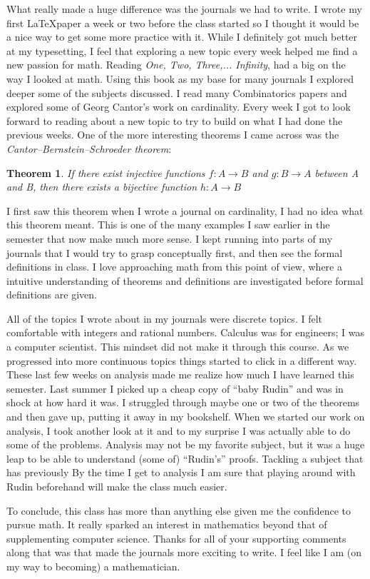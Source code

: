 \documentclass{article}
\newtheorem*{thm}{Theorem}
\begin{document}
What really made a huge difference was the journals we had to write.
I wrote my first \LaTeX  paper a week or two before the class started so I thought it would be a nice way to get some more practice with it.
While I definitely got much better at my typesetting, I feel that exploring a new topic every week helped me find a new passion for math.
Reading \textit{One, Two, Three,... Infinity}, had a big on the way I looked at math.
Using this book as my base for many journals I explored deeper some of the subjects discussed.
I read many Combinatorics papers and explored some of Georg Cantor's work on cardinality.
Every week I got to look forward to reading about a new topic to try to build on what I had done the previous weeks.
One of the more interesting theorems I came across was the \textit{Cantor–Bernstein–Schroeder theorem}:
\begin{thm}
If there exist injective functions $f : A \to B$ and $g : B \to A$ between A and B, then there exists a bijective function $h : A \to B$
\end{thm}
I first saw this theorem when I wrote a journal on cardinality, I had no idea what this theorem meant.
This is one of the many examples I saw earlier in the semester that now make much more sense.
I kept running into parts of my journals that I would try to grasp conceptually first, and then see the formal definitions in class.
I love approaching math from this point of view, where a intuitive understanding of theorems and definitions are investigated before formal definitions are given.

All of the topics I wrote about in my journals were discrete topics.
I felt comfortable with integers and rational numbers.
Calculus was for engineers; I was a computer scientist.
This mindset did not make it through this course.
As we progressed into more continuous topics things started to click in a different way.
These last few weeks on analysis made me realize how much I have learned this semester.
Last summer I picked up a cheap copy of ``baby Rudin'' and was in shock at how hard it was.
I struggled through maybe one or two of the theorems and then gave up, putting it away in my bookshelf.
When we started our work on analysis, I took another look at it and to my surprise I was actually able to do some of the problems.
Analysis may not be my favorite subject, but it was a huge leap to be able to understand (some of) ``Rudin's'' proofs.
Tackling a subject that has previously 
By the time I get to analysis I am sure that playing around with Rudin beforehand will make the class much easier.



To conclude, this class has more than anything else given me the confidence to pursue math. 
It really sparked an interest in mathematics beyond that of supplementing computer science.
Thanks for all of your supporting comments along that was that made the journals more exciting to write.
I feel like I am (on my way to becoming) a mathematician.


\begin{quote}

\end{quote}
\end{document}
